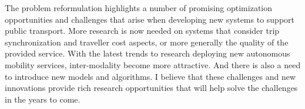 \documentclass{article}
\begin{document}
The problem reformulation highlights a number of promising optimization opportunities and challenges that arise when developing new systems to support public transport.
More research is now needed on systems that consider trip synchronization and traveller cost aspects, or more generally the quality of the provided service. With the latest trends to research deploying new autonomous mobility services, inter-modality become more attractive. And there is also a need to introduce new models and algorithms.
I believe that these challenges and new innovations provide rich research opportunities that will help solve the challenges in the years to come. %
\newpage


\end{document}
